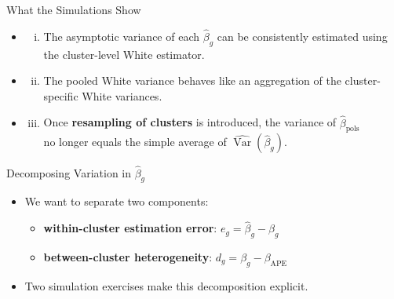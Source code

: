 \documentclass[
  ignorenonframetext,
]{beamer}
\providecommand{\tightlist}{%
  \setlength{\itemsep}{0pt}\setlength{\parskip}{0pt}}
\begin{document}
\begin{frame}{What the Simulations Show}
\label{what-the-simulations-show}
\begin{itemize}
\tightlist
\item
  \begin{enumerate}
  [(i)]
  \tightlist
  \item
    The asymptotic variance of each \(\hat{\beta}_g\) can be
    consistently estimated using\\
    the cluster-level White estimator.\\
  \end{enumerate}
\item
  \begin{enumerate}
  [(i)]
  \setcounter{enumi}{1}
  \tightlist
  \item
    The pooled White variance behaves like an aggregation of the
    cluster-specific White variances.\\
  \end{enumerate}
\item
  \begin{enumerate}
  [(i)]
  \setcounter{enumi}{2}
  \tightlist
  \item
    Once \textbf{resampling of clusters} is introduced, the variance of
    \(\hat{\beta}_{\text{pols}}\)\\
    no longer equals the simple average of
    \(\widehat{\operatorname{Var}}(\hat{\beta}_g)\).
  \end{enumerate}
\end{itemize}
\end{frame}

\begin{frame}{Decomposing Variation in \(\hat{\beta}_g\)}
\label{decomposing-variation-in-hatbeta_g}
\begin{itemize}
\tightlist
\item
  We want to separate two components:

  \begin{itemize}
  \tightlist
  \item
    \textbf{within-cluster estimation error}:
    \(e_g = \hat{\beta}_g - \beta_g\)
  \item
    \textbf{between-cluster heterogeneity}:
    \(d_g = \beta_g - \beta_{\text{APE}}\)
  \end{itemize}
\item
  Two simulation exercises make this decomposition explicit.
\end{itemize}
\end{frame}
\end{document}
